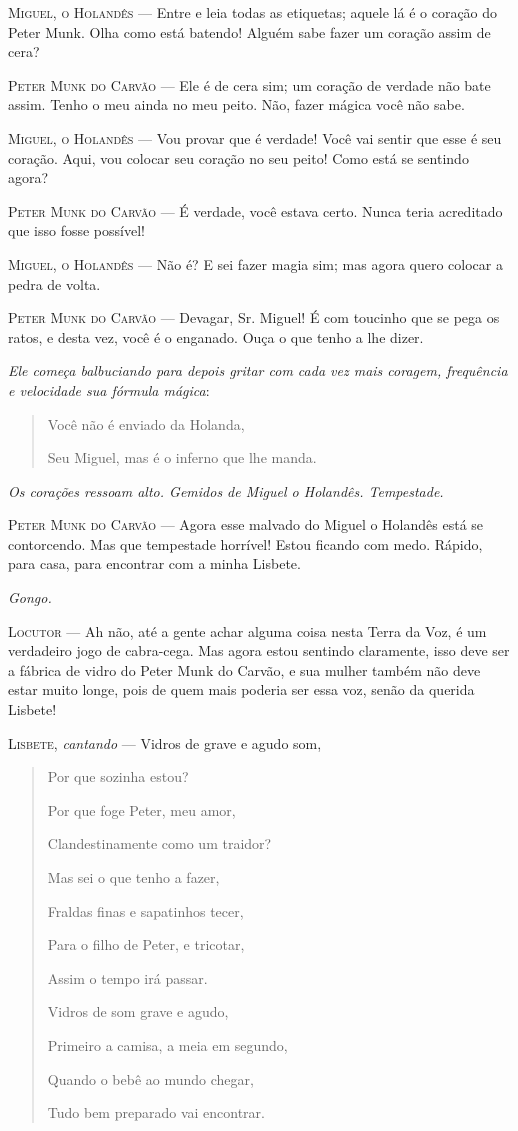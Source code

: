 \textsc{Miguel, o Holandês} --- Entre e leia todas as etiquetas; aquele lá é o
coração do Peter Munk. Olha como está batendo! Alguém sabe fazer um
coração assim de cera?

\textsc{Peter Munk do Carvão} --- Ele é de cera sim; um coração de verdade não
bate assim. Tenho o meu ainda no meu peito. Não, fazer mágica você não
sabe.

\textsc{Miguel, o Holandês} --- Vou provar que é verdade! Você vai sentir que esse
é seu coração. Aqui, vou colocar seu coração no seu peito! Como está se
sentindo agora?

\textsc{Peter Munk do Carvão} --- É verdade, você estava certo. Nunca teria
acreditado que isso fosse possível!

\textsc{Miguel, o Holandês} --- Não é? E sei fazer magia sim; mas agora quero
colocar a pedra de volta.

\textsc{Peter Munk do Carvão} --- Devagar, Sr. Miguel! É com toucinho que se pega
os ratos, e desta vez, você é o enganado. Ouça o que tenho a lhe dizer.

\emph{Ele começa balbuciando para depois gritar com cada vez mais
coragem, frequência e velocidade sua fórmula mágica}:

\begin{quote}
Você não é enviado da Holanda,

Seu Miguel, mas é o inferno que lhe manda.
\end{quote}

\emph{Os corações ressoam alto. Gemidos de Miguel o Holandês.
Tempestade.}

\textsc{Peter Munk do Carvão} --- Agora esse malvado do Miguel o Holandês está se
contorcendo. Mas que tempestade horrível! Estou ficando com medo.
Rápido, para casa, para encontrar com a minha Lisbete.

\emph{Gongo.}

\textsc{Locutor} --- Ah não, até a gente achar alguma coisa nesta Terra da Voz, é
um verdadeiro jogo de cabra-cega. Mas agora estou sentindo claramente,
isso deve ser a fábrica de vidro do Peter Munk do Carvão, e sua mulher
também não deve estar muito longe, pois de quem mais poderia ser essa
voz, senão da querida Lisbete!

\textsc{Lisbete}, \emph{cantando} --- Vidros de grave e agudo som,

\begin{verse}

Por que sozinha estou?

Por que foge Peter, meu amor,

Clandestinamente como um traidor?

Mas sei o que tenho a fazer,

Fraldas finas e sapatinhos tecer,

Para o filho de Peter, e tricotar,

Assim o tempo irá passar.

Vidros de som grave e agudo,

Primeiro a camisa, a meia em segundo,

Quando o bebê ao mundo chegar,

Tudo bem preparado vai encontrar.
\end{verse}

